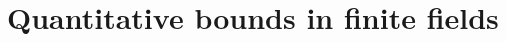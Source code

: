 \documentclass{report}
\theoremstyle{remark}
\numberwithin{equation}{section}
\begin{document}




  


\section{Quantitative bounds in finite fields}
\end{document}
